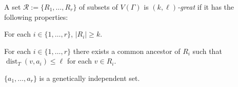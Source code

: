 \documentclass{patmorin}
\newcommand{\defin}[1]{\emph{\color{brightmaroon}#1}}
\DeclareMathOperator{\dist}{dist}
\begin{document}




A set $\mathcal{R}:=\{R_1,\ldots,R_r\}$ of subsets of $V(\Gamma)$ is \defin{$(k,\ell)$-great} if it has the following properties:

\begin{compactenum}
  \item For each $i\in\{1,\ldots,r\}$, $|R_i|\ge k$.
  \item For each $i\in\{1,\ldots,r\}$ there exists a common ancestor of $R_i$ such that $\dist_T(v,a_i)\le\ell$ for each $v\in R_i$.
  \item $\{a_1,\ldots,a_r\}$ is a genetically independent set.
\end{compactenum}
\end{document}
